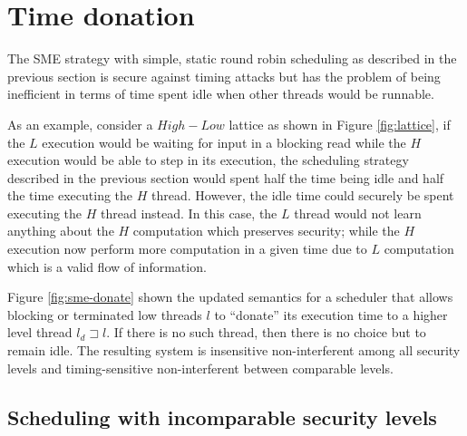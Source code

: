\documentclass[10pt,preprint]{sigplanconf}
\begin{document}
\section{Time donation}
\label{s:donate}

The SME strategy with simple, static round robin scheduling as described in the previous section is secure against timing attacks but has the problem of being inefficient in terms of time spent idle when other threads would be runnable.

As an example, consider a $High-Low$ lattice as shown in Figure \ref{fig:lattice}, if the $L$ execution would be waiting for input in a blocking read while the $H$ execution would be able to step in its execution, the scheduling strategy described in the previous section would spent half the time being idle and half the time executing the $H$ thread.  However, the idle time could securely be spent executing the $H$ thread instead.  In this case, the $L$ thread would not learn anything about the $H$ computation which preserves security; while the $H$ execution now perform more computation in a given time due to $L$ computation which is a valid flow of information.

Figure \ref{fig:sme-donate} shown the updated semantics for a scheduler that allows blocking or terminated low threads $l$ to ``donate'' its execution time to a higher level thread $l_d \sqsupset l$.  If there is no such thread, then there is no choice but to remain idle.  The resulting system is insensitive non-interferent among all security levels and timing-sensitive non-interferent between comparable levels.

\subsection{Scheduling with incomparable security levels}
\end{document}
